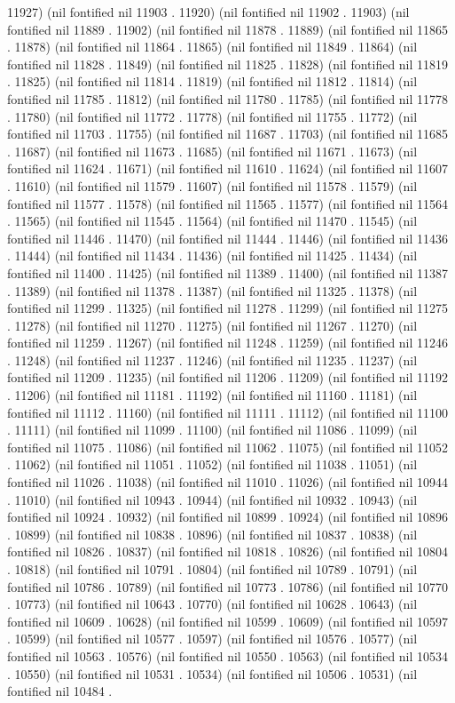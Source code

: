 11927) (nil fontified nil 11903 . 11920) (nil fontified nil 11902 . 11903) (nil fontified nil 11889 . 11902) (nil fontified nil 11878 . 11889) (nil fontified nil 11865 . 11878) (nil fontified nil 11864 . 11865) (nil fontified nil 11849 . 11864) (nil fontified nil 11828 . 11849) (nil fontified nil 11825 . 11828) (nil fontified nil 11819 . 11825) (nil fontified nil 11814 . 11819) (nil fontified nil 11812 . 11814) (nil fontified nil 11785 . 11812) (nil fontified nil 11780 . 11785) (nil fontified nil 11778 . 11780) (nil fontified nil 11772 . 11778) (nil fontified nil 11755 . 11772) (nil fontified nil 11703 . 11755) (nil fontified nil 11687 . 11703) (nil fontified nil 11685 . 11687) (nil fontified nil 11673 . 11685) (nil fontified nil 11671 . 11673) (nil fontified nil 11624 . 11671) (nil fontified nil 11610 . 11624) (nil fontified nil 11607 . 11610) (nil fontified nil 11579 . 11607) (nil fontified nil 11578 . 11579) (nil fontified nil 11577 . 11578) (nil fontified nil 11565 . 11577) (nil fontified nil 11564 . 11565) (nil fontified nil 11545 . 11564) (nil fontified nil 11470 . 11545) (nil fontified nil 11446 . 11470) (nil fontified nil 11444 . 11446) (nil fontified nil 11436 . 11444) (nil fontified nil 11434 . 11436) (nil fontified nil 11425 . 11434) (nil fontified nil 11400 . 11425) (nil fontified nil 11389 . 11400) (nil fontified nil 11387 . 11389) (nil fontified nil 11378 . 11387) (nil fontified nil 11325 . 11378) (nil fontified nil 11299 . 11325) (nil fontified nil 11278 . 11299) (nil fontified nil 11275 . 11278) (nil fontified nil 11270 . 11275) (nil fontified nil 11267 . 11270) (nil fontified nil 11259 . 11267) (nil fontified nil 11248 . 11259) (nil fontified nil 11246 . 11248) (nil fontified nil 11237 . 11246) (nil fontified nil 11235 . 11237) (nil fontified nil 11209 . 11235) (nil fontified nil 11206 . 11209) (nil fontified nil 11192 . 11206) (nil fontified nil 11181 . 11192) (nil fontified nil 11160 . 11181) (nil fontified nil 11112 . 11160) (nil fontified nil 11111 . 11112) (nil fontified nil 11100 . 11111) (nil fontified nil 11099 . 11100) (nil fontified nil 11086 . 11099) (nil fontified nil 11075 . 11086) (nil fontified nil 11062 . 11075) (nil fontified nil 11052 . 11062) (nil fontified nil 11051 . 11052) (nil fontified nil 11038 . 11051) (nil fontified nil 11026 . 11038) (nil fontified nil 11010 . 11026) (nil fontified nil 10944 . 11010) (nil fontified nil 10943 . 10944) (nil fontified nil 10932 . 10943) (nil fontified nil 10924 . 10932) (nil fontified nil 10899 . 10924) (nil fontified nil 10896 . 10899) (nil fontified nil 10838 . 10896) (nil fontified nil 10837 . 10838) (nil fontified nil 10826 . 10837) (nil fontified nil 10818 . 10826) (nil fontified nil 10804 . 10818) (nil fontified nil 10791 . 10804) (nil fontified nil 10789 . 10791) (nil fontified nil 10786 . 10789) (nil fontified nil 10773 . 10786) (nil fontified nil 10770 . 10773) (nil fontified nil 10643 . 10770) (nil fontified nil 10628 . 10643) (nil fontified nil 10609 . 10628) (nil fontified nil 10599 . 10609) (nil fontified nil 10597 . 10599) (nil fontified nil 10577 . 10597) (nil fontified nil 10576 . 10577) (nil fontified nil 10563 . 10576) (nil fontified nil 10550 . 10563) (nil fontified nil 10534 . 10550) (nil fontified nil 10531 . 10534) (nil fontified nil 10506 . 10531) (nil fontified nil 10484 . 